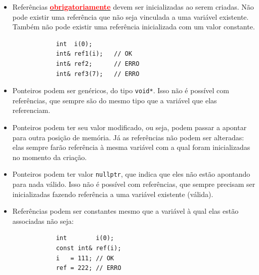 \documentclass{article}
\begin{document}
	\noindent\fbox{\usebox{\caixadecodigo}}
	
	\vspace{1.5em}
	
	\begin{itemize}
		\item Referências \underline{\textbf{\textcolor{red}{obrigatoriamente}}} devem ser inicializadas ao serem criadas. Não pode existir uma referência que não seja vinculada a uma variável existente. Também não pode existir uma referência inicializada com um valor constante.
		\begin{verbatim}
			int  i(0);
			int& ref1(i);   // OK
			int& ref2;      // ERRO
			int& ref3(7);   // ERRO
		\end{verbatim}
		
		\item Ponteiros podem ser genéricos, do tipo \texttt{void*}. Isso não é possível com referências, que sempre são do mesmo tipo que a variável que elas referenciam.
		
		\item Ponteiros podem ter seu valor modificado, ou seja, podem passar a apontar para outra posição de memória. Já as referências não podem ser alteradas: elas sempre farão referência à mesma variável com a qual foram inicializadas no momento da criação.
		
		\item Ponteiros podem ter valor \texttt{nullptr}, que indica que eles não estão apontando para nada válido. Isso não é possível com referências, que sempre precisam ser inicializadas fazendo referência a uma variável existente (válida).
		
		\item Referências podem ser constantes mesmo que a variável à qual elas estão associadas não seja:
		\begin{verbatim}
			int        i(0);
			const int& ref(i);
			i   = 111; // OK
			ref = 222; // ERRO
		\end{verbatim}
	\end{itemize}
	
\end{document}
